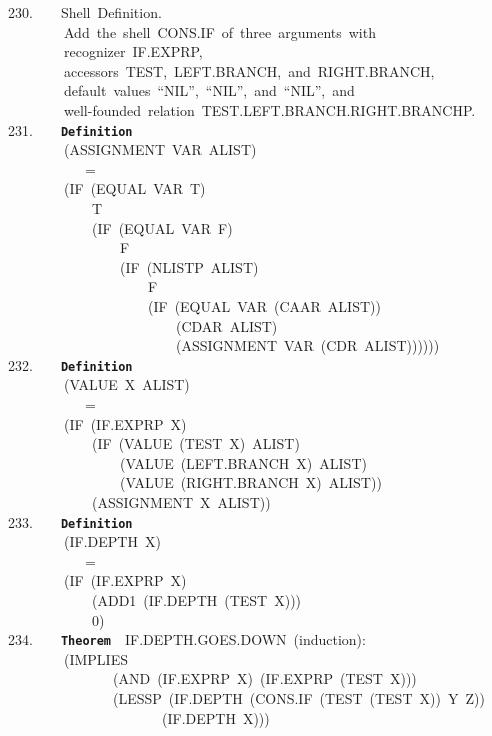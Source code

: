 \documentclass[11pt]{book}
\newenvironment{pubasis}{\begin{flushleft}\ttfamily\small}{\normalsize\rmfamily\end{flushleft}}
\newcommand{\axiomordefinition}[1]{\vspace{6pt}\texttt{\textbf{#1}}}
\begin{document}
\begin{pubasis}
230.~~~~Shell~Definition.\\
~~~~~~~~Add~the~shell~CONS.IF~of~three~arguments~with\\
~~~~~~~~recognizer~IF.EXPRP,\\
~~~~~~~~accessors~TEST,~LEFT.BRANCH,~and~RIGHT.BRANCH,\\
~~~~~~~~default~values~``NIL'',~``NIL'',~and~``NIL'',~and\\
~~~~~~~~well-founded~relation~TEST.LEFT.BRANCH.RIGHT.BRANCHP.\\

231.~~~~\axiomordefinition{Definition}\\
~~~~~~~~(ASSIGNMENT~VAR~ALIST)\\
~~~~~~~~~~~=\\
~~~~~~~~(IF~(EQUAL~VAR~T)\\
~~~~~~~~~~~~T\\
~~~~~~~~~~~~(IF~(EQUAL~VAR~F)\\
~~~~~~~~~~~~~~~~F\\
~~~~~~~~~~~~~~~~(IF~(NLISTP~ALIST)\\
~~~~~~~~~~~~~~~~~~~~F\\
~~~~~~~~~~~~~~~~~~~~(IF~(EQUAL~VAR~(CAAR~ALIST))\\
~~~~~~~~~~~~~~~~~~~~~~~~(CDAR~ALIST)\\
~~~~~~~~~~~~~~~~~~~~~~~~(ASSIGNMENT~VAR~(CDR~ALIST))))))\\

232.~~~~\axiomordefinition{Definition}\\
~~~~~~~~(VALUE~X~ALIST)\\
~~~~~~~~~~~=\\
~~~~~~~~(IF~(IF.EXPRP~X)\\
~~~~~~~~~~~~(IF~(VALUE~(TEST~X)~ALIST)\\
~~~~~~~~~~~~~~~~(VALUE~(LEFT.BRANCH~X)~ALIST)\\
~~~~~~~~~~~~~~~~(VALUE~(RIGHT.BRANCH~X)~ALIST))\\
~~~~~~~~~~~~(ASSIGNMENT~X~ALIST))\\

233.~~~~\axiomordefinition{Definition}\\
~~~~~~~~(IF.DEPTH~X)\\
~~~~~~~~~~~=\\
~~~~~~~~(IF~(IF.EXPRP~X)\\
~~~~~~~~~~~~(ADD1~(IF.DEPTH~(TEST~X)))\\
~~~~~~~~~~~~0)\\

234.~~~~\axiomordefinition{Theorem}~~IF.DEPTH.GOES.DOWN~(induction):\\
~~~~~~~~(IMPLIES\\
~~~~~~~~~~~~~~~(AND~(IF.EXPRP~X)~(IF.EXPRP~(TEST~X)))\\
~~~~~~~~~~~~~~~(LESSP~(IF.DEPTH~(CONS.IF~(TEST~(TEST~X))~Y~Z))\\
~~~~~~~~~~~~~~~~~~~~~~(IF.DEPTH~X)))\\


\end{pubasis}
\end{document}
